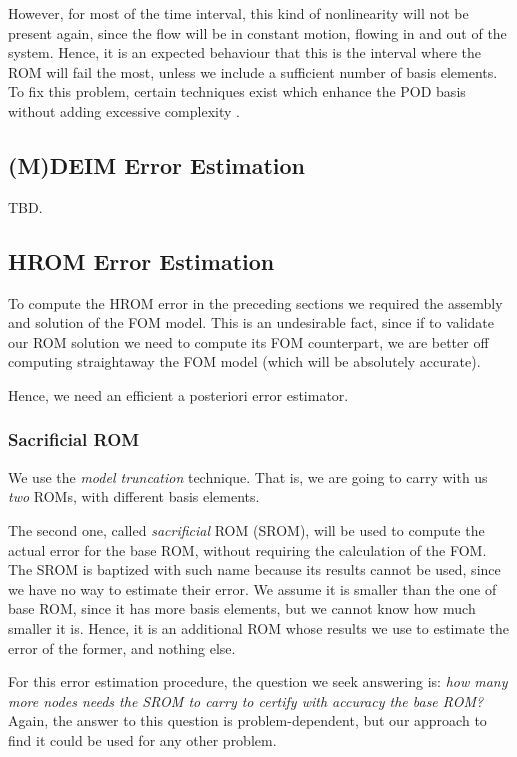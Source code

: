\documentclass[../../thesis.tex]{subfiles}
\begin{document}
However, for most of the time interval, this kind of nonlinearity will not be present again,
since the flow will be in constant motion, flowing in and out of the system.
Hence, it is an expected behaviour that this is the interval where the ROM will fail the most,
unless we include a sufficient number of basis elements.
To fix this problem, certain techniques exist which enhance the POD basis 
without adding excessive complexity \cite{weightedPOD}.

\subsection{(M)DEIM Error Estimation}
TBD.

\subsection{HROM Error Estimation}
\label{sec:hrom_results_posteriori_error_estimation}
To compute the HROM error in the preceding sections
we required the assembly and solution of the FOM model.
This is an undesirable fact, since if to validate our ROM solution
we need to compute its FOM counterpart, 
we are better off computing straightaway the FOM model 
(which will be absolutely accurate).

Hence, we need an efficient a posteriori error estimator.

\subsubsection{Sacrificial ROM}
We use the \textit{model truncation} technique.
That is, we are going to carry with us \textit{two} ROMs,
with different basis elements.

The second one, called \textit{sacrificial} ROM (SROM),
will be used to compute the actual error for the base ROM,
without requiring the calculation of the FOM.
The SROM is baptized with such name because its results cannot be used,
since we have no way to estimate their error.
We assume it is smaller than the one of base ROM, since it has more basis elements,
but we cannot know how much smaller it is.
Hence, it is an additional ROM whose results we use to estimate the error of the former, 
and nothing else.

For this error estimation procedure, the question we seek answering is:
\textit{how many more nodes needs the SROM to carry to certify with accuracy the base ROM?}
Again, the answer to this question is problem-dependent,
but our approach to find it could be used for any other problem.
\end{document}
